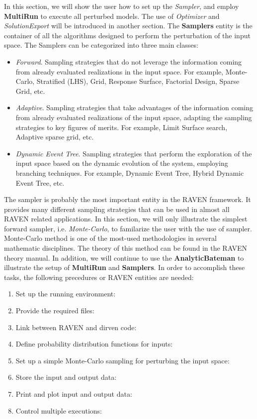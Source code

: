 In this section, we will show the user how to set up the \textit{Sampler}, and employ \textbf{MultiRun} to execute
all perturbed models. The use of \textit{Optimizer} and \textit{SolutionExport} will be introduced in another section.
The \textbf{Samplers}  entity is the container of all the algorithms designed to perform the perturbation of the
input space. The Samplers can be categorized into three main classes:

\begin{itemize}
  \item  \textit{Forward}. Sampling strategies that do not leverage the information coming from already evaluated
    realizations in the input space. For example, Monte-Carlo, Stratified (LHS), Grid, Response Surface, Factorial Design,
    Sparse Grid, etc.
  \item  \textit{Adaptive}. Sampling strategies that take advantages of the information coming from already evaluated
    realizations of the input space, adapting the sampling strategies to key figures of merits. For example, Limit Surface
    search, Adaptive sparse grid, etc.
  \item \textit{Dynamic Event Tree}. Sampling strategies that perform the exploration of the input space based on the
    dynamic evolution of the system, employing branching techniques. For example, Dynamic Event Tree, Hybrid
    Dynamic Event Tree, etc.
\end{itemize}

The sampler is probably the most important entity in the RAVEN framework. It provides many different sampling
strategies that can be used in almost all RAVEN related applications. In this section, we will only illustrate
the simplest forward sampler, i.e. \textit{Monte-Carlo}, to familarize the user with the use of sampler. Monte-Carlo method
is one of the most-used methodologies in several mathematic disciplines. The theory of this method can be found in
the RAVEN theory manual. In addition, we will continue to use the \textbf{AnalyticBateman} to illustrate the setup
of \textbf{MultiRun} and \textbf{Samplers}. In order to accomplish these tasks, the following precedures or RAVEN
entities are needed:

\begin{enumerate}
  \item Set up the running environment: 
  \item Provide the required files: 
  \item Link between RAVEN and dirven code: 
  \item Define probability distribution functions for inputs: 
  \item Set up a simple Monte-Carlo sampling for perturbing the input space: 
  \item Store the input and output data: 
  \item Print and plot input and output data: 
  \item Control multiple executions: 
\end{enumerate}

